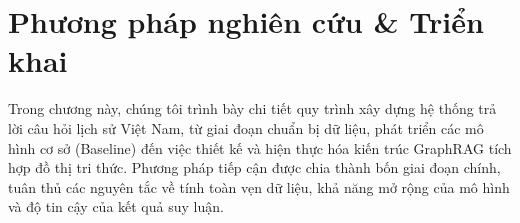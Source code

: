 \chapter{Phương pháp nghiên cứu \& Triển khai}
Trong chương này, chúng tôi trình bày chi tiết quy trình xây dựng hệ thống trả lời câu hỏi lịch sử Việt Nam, từ giai đoạn chuẩn bị dữ liệu, phát triển các mô hình cơ sở (Baseline) đến việc thiết kế và hiện thực hóa kiến trúc GraphRAG tích hợp đồ thị tri thức. Phương pháp tiếp cận được chia thành bốn giai đoạn chính, tuân thủ các nguyên tắc về tính toàn vẹn dữ liệu, khả năng mở rộng của mô hình và độ tin cậy của kết quả suy luận. 




